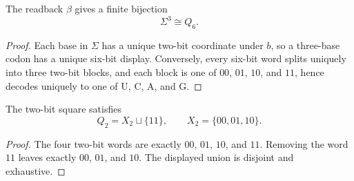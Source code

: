 \begin{lemma}
\label{lem:philosophy-codon-cube-window-six-bijection}
The readback $\beta$ gives a finite bijection
$$
  \Sigma^{3}\cong Q_{6}.
$$
\end{lemma}
\begin{proof}
Each base in $\Sigma$ has a unique two-bit coordinate under $b$, so a
three-base codon has a unique six-bit display. Conversely, every six-bit
word splits uniquely into three two-bit blocks, and each block is one of
$00$, $01$, $10$, and $11$, hence decodes uniquely to one of
$\mathrm{U}$, $\mathrm{C}$, $\mathrm{A}$, and $\mathrm{G}$.
\end{proof}

\begin{lemma}
\label{thm:philosophy-local-two-bit-partition}
The two-bit square satisfies
$$
  Q_{2}=X_{2}\sqcup\{11\},
  \qquad
  X_{2}=\{00,01,10\}.
$$
\end{lemma}
\begin{proof}
The four two-bit words are exactly $00$, $01$, $10$, and $11$. Removing
the word $11$ leaves exactly $00$, $01$, and $10$. The displayed union is
disjoint and exhaustive.
\end{proof}
